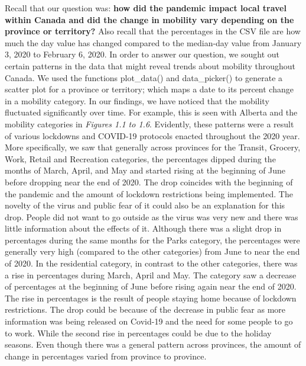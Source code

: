 \documentclass[fontsize=11pt]{article}
\begin{document}
    Recall that our question was: \textbf{how did the pandemic impact local travel within Canada and did the change in mobility vary depending on the province or territory?} Also recall that the percentages in the CSV file are how much the day value has changed compared to the median-day value from January 3, 2020 to February 6, 2020. In order to answer our question, we sought out certain patterns in the data that might reveal trends about mobility throughout Canada. We used the functions plot\_data() and data\_picker() to generate a scatter plot for a province or territory; which maps a date to its percent change in a mobility category. In our findings, we have noticed that the mobility fluctuated significantly over time. For example, this is seen with Alberta and the mobility categories in \emph{Figures 1.1 to 1.6}. Evidently, these patterns were a result of various lockdowns and COVID-19 protocols enacted throughout the 2020 year. More specifically, we saw that generally across provinces for the Transit, Grocery, Work, Retail and Recreation categories, the percentages dipped during the months of March, April, and May and started rising at the beginning of June before dropping near the end of 2020. The drop coincides with the beginning of the pandemic and the amount of lockdown restrictions being implemented. The novelty of the virus and public fear of it could also be an explanation for this drop. People did not want to go outside as the virus was very new and there was little information about the effects of it. Although there was a slight drop in percentages during the same months for the Parks category, the percentages were generally very high (compared to the other categories) from June to near the end of 2020. In the residential category, in contrast to the other categories, there was a rise in percentages during March, April and May. The category saw a decrease of percentages at the beginning of June before rising again near the end of 2020. The rise in percentages is the result of people staying home because of lockdown restrictions. The drop could be because of the decrease in public fear as more information was being released on Covid-19 and the need for some people to go to work. While the second rise in percentages could be due to the holiday seasons. Even though there was a general pattern across provinces, the amount of change in percentages varied from province to province.\\
\end{document}
